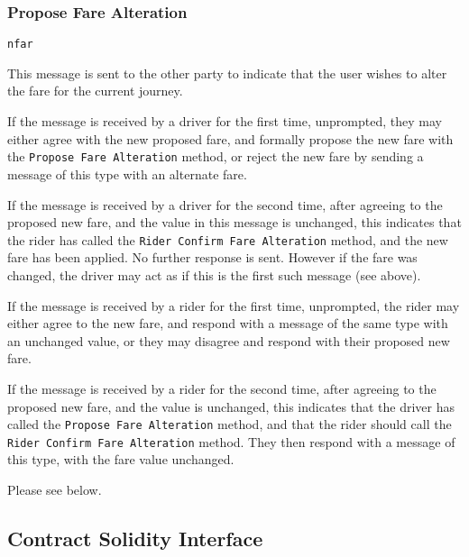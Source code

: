 \subsubsection{Propose Fare Alteration}

\begin{description}[leftmargin=6em,style=nextline]
	\item [Topic]
		\lstinline{nfar}
	\item [Purpose]
		This message is sent to the other party to indicate that the user wishes to alter the fare for the current journey.
	\item [Response]
		If the message is received by a driver for the first time, unprompted, they may either agree with the new proposed fare, and formally propose the new fare with the \lstinline{Propose Fare Alteration} method, or reject the new fare by sending a message of this type with an alternate fare.
		
		If the message is received by a driver for the second time, after agreeing to the proposed new fare, and the value in this message is unchanged, this indicates that the rider has called the \lstinline{Rider Confirm Fare Alteration} method, and the new fare has been applied. No further response is sent. However if the fare was changed, the driver may act as if this is the first such message (see above).
		
		If the message is received by a rider for the first time, unprompted, the rider may either agree to the new fare, and respond with a message of the same type with an unchanged value, or they may disagree and respond with their proposed new fare.
		
		If the message is received by a rider for the second time, after agreeing to the proposed new fare, and the value is unchanged, this indicates that the driver has called the \lstinline{Propose Fare Alteration} method, and that the rider should call the \lstinline{Rider Confirm Fare Alteration} method. They then respond with a message of this type, with the fare value unchanged.
	\item [Payload]
		Please see below.
\end{description}



\subsection{Contract Solidity Interface}

